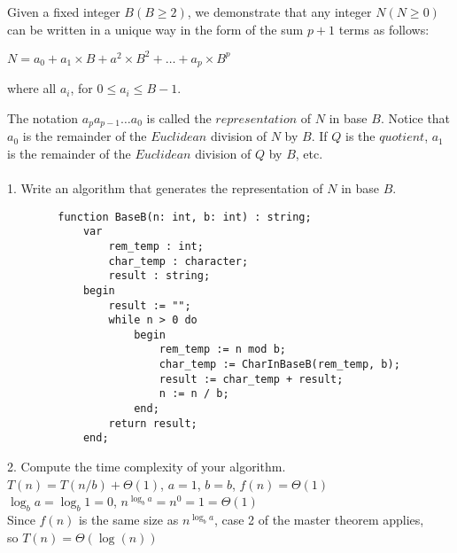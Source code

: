 \documentclass[12pt]{article}
\newenvironment{problem}[2][Problem]{\begin{trivlist}
\item[\hskip \labelsep {\bfseries #1}\hskip \labelsep {\bfseries #2.}]}{\end{trivlist}}
\begin{document}
\begin{problem}{2}
    Given a fixed integer $B  (B\geq 2)$, we demonstrate that any integer $N (N\geq 0)$ 
    can be written in a unique way in the form of the sum $p+1$ terms as follows:
    \begin{center}
        $N = a_0 + a_1 \times B + a^2 \times B^2 + \ldots + a_p \times B^p$
    \end{center}
    where all $a_i$, for $0 \leq a_i \leq B - 1$.
    
    The notation $a_pa_{p-1}\ldots a_0$ is called the $representation$ of $N$ in base $B$. 
    Notice that $a_0$ is the remainder of the $Euclidean$ division of $N$ by $B$. 
    If $Q$ is the $quotient$, $a_1$ is the remainder of the $Euclidean$ division
    of $Q$ by $B$, etc.\\\\
    1. Write an algorithm that generates the representation of $N$ in base $B$.
    \begin{verbatim}
        function BaseB(n: int, b: int) : string;
            var
                rem_temp : int;
                char_temp : character;
                result : string;
            begin
                result := "";
                while n > 0 do
                    begin
                        rem_temp := n mod b;
                        char_temp := CharInBaseB(rem_temp, b);
                        result := char_temp + result;
                        n := n / b;
                    end;
                return result;
            end;
    \end{verbatim}
    2. Compute the time complexity of your algorithm.\\
    $T(n) = T(n/b) + \Theta(1)$, $a = 1$, $b = b$, $f(n) = \Theta(1)$\\
    $\log_b{a} = \log_b{1} = 0$, $n^{\log_b{a}} = n^0 = 1 = \Theta(1)$\\
    Since $f(n)$ is the same size as $n^{\log_b{a}}$, case 2 of the master theorem applies,\\
    so $T(n) = \Theta(\log(n))$


\end{problem}
 
 
\end{document}
